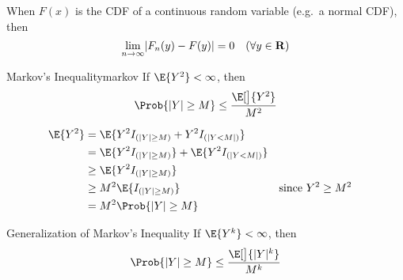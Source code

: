 \begin{Remark}{}{}
    When $ F(x) $ is the CDF of a continuous random variable
    (e.g.\ a normal CDF), then
    \[ \lim\limits_{{n} \to {\infty}} \lvert F_n(y)-F(y)\rvert=0\quad(\forall y\in\mathbf{R}) \]
\end{Remark}
\begin{Theorem}{Markov's Inequality}{markov}
    If $ \E{Y^2}<\infty $, then
    \[ \Prob{\abs{Y}\ge M}\le \frac{\E[\big]{Y^2}}{M^2}  \]
\end{Theorem}
\begin{Proof}{}{}
    \begin{align*}
        \E{Y^2}
         & =\E{Y^2 I_{(\abs{Y}\ge M)}+Y^2 I_{(\abs{Y<M})}}                                    \\
         & =\E{Y^2 I_{(\abs{Y}\ge M)}} + \E{Y^2 I_{(\abs{Y<M})}}                              \\
         & \ge \E{Y^2 I_{(\abs{Y}\ge M)}}                                                     \\
         & \ge M^2\E{I_{(\abs{Y}\ge M)}}                         &  & \text{since }Y^2\ge M^2 \\
         & =M^2\Prob{\abs{Y}\ge M}
    \end{align*}
\end{Proof}
\begin{Remark}{Generalization of Markov's Inequality}{}
    If $ \E{Y^k}<\infty $, then
    \[ \Prob{\abs{Y}\ge M}\le  \frac{\E[\big]{\abs{Y}^k}}{M^k}  \]
\end{Remark}
